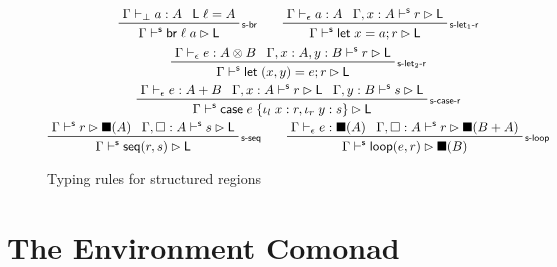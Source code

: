 \documentclass[acmsmall,screen,review]{acmart}
\newcommand{\ms}[1]{\ensuremath{\mathsf{#1}}}
\newcommand{\lto}{:}
\newcommand{\linl}[1]{\iota_l\;{#1}}
\newcommand{\linr}[1]{\iota_r\;{#1}}
\newcommand{\letstmt}[3]{\ensuremath{\ms{let}\;#1 = #2; #3}}
\newcommand{\brb}[2]{\ms{br}\;#1\;#2}
\newcommand{\casestmt}[5]{\ms{case}\;#1\;\{\linl{#2} \lto #3, \linr{#4} \lto #5\}}
\newcommand{\bhyp}[2]{#1 : #2}
\newcommand{\rle}[1]{{\scriptsize\textsf{#1}}}
\newcommand{\hasty}[4]{#1 \vdash_{#2} #3: {#4}}
\newcommand{\shaslb}[3]{#1 \vdash^{\ms{s}} #2 \rhd #3}
\newcommand{\invar}{\square}
\newcommand{\outlb}{\blacksquare}
\begin{document}
\begin{figure}
  \begin{gather*}
    \prftree[r]{\rle{s-br}}{\hasty{\Gamma}{\bot}{a}{A}}{\ms{L}\;\ell = A}
      {\shaslb{\Gamma}{\brb{\ell}{a}}{\ms{L}}} \qquad
    \prftree[r]{\rle{s-let$_1$-r}}
      {\hasty{\Gamma}{\epsilon}{a}{A}}
      {\shaslb{\Gamma, \bhyp{x}{A}}{r}{\ms{L}}}
      {\shaslb{\Gamma}{\letstmt{x}{a}{r}}{\ms{L}}} \\
    \prftree[r]{\rle{s-let$_2$-r}}
      {\hasty{\Gamma}{\epsilon}{e}{A \otimes B}}
      {\shaslb{\Gamma, \bhyp{x}{A}, \bhyp{y}{B}}{r}{\ms{L}}}
      {\shaslb{\Gamma}{\letstmt{(x, y)}{e}{r}}{\ms{L}}} \\
    \prftree[r]{\rle{s-case-r}}
      {\hasty{\Gamma}{\epsilon}{e}{A + B}}
      {\shaslb{\Gamma, \bhyp{x}{A}}{r}{\ms{L}}}
      {\shaslb{\Gamma, \bhyp{y}{B}}{s}{\ms{L}}}
      {\shaslb{\Gamma}{\casestmt{e}{x}{r}{y}{s}}{\ms{L}}} \\
    \prftree[r]{\rle{s-seq}}
      {\shaslb{\Gamma}{r}{\outlb(A)}}
      {\shaslb{\Gamma, \bhyp{\invar}{A}}{s}{\ms{L}}}
      {\shaslb{\Gamma}{\ms{seq}(r, s)}{\ms{L}}} \qquad
    \prftree[r]{\rle{s-loop}}
      {\hasty{\Gamma}{\epsilon}{e}{\outlb(A)}}
      {\shaslb{\Gamma, \bhyp{\invar}{A}}{r}{\outlb(B + A)}}
      {\shaslb{\Gamma}{\ms{loop}(e, r)}{\outlb(B)}}
  \end{gather*}
  \caption{Typing rules for structured regions}
  \Description{}
  \label{fig:structured-regions}
\end{figure}

\section{The Environment Comonad}

\label{apx:environment}
\end{document}
